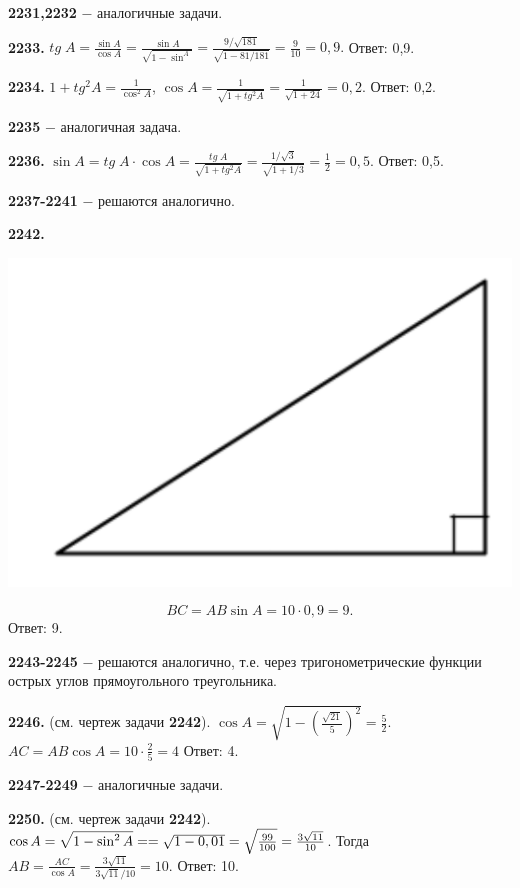  \textbf{2231,2232} $-$ аналогичные задачи.
 
 \textbf{2233.} $tg\;A=\frac{\sin{A}}{\cos{A}}=\frac{\sin{A}}{\sqrt{1-\sin^{A}}} = \frac{9/\sqrt{181}}{\sqrt{1 - 81/181}}=\frac{9}{10}=0,9.$ \newline \null \hspace*{\fill} Ответ: 0,9.
 
 \textbf{2234.} $1 + tg^2A=\frac{1}{\cos^2{A}}$, $\cos{A} = \frac{1}{\sqrt{1+tg^2A}}=\frac{1}{\sqrt{1+24}} = 0,2.$ \newline \null \hspace*{\fill} Ответ: 0,2.
 
 \textbf{2235} $-$ аналогичная задача.
 
 \textbf{2236.} $\sin{A} = tg\; A\cdot \cos{A} = \frac{tg\;A}{\sqrt{1+tg^2A}}=\frac{1/\sqrt{3}}{\sqrt{1+1/3}}=\frac{1}{2}=0,5$. \newline \null \hspace*{\fill} Ответ: 0,5.
 
 \textbf{2237-2241} $-$ решаются аналогично.
 
 \clearpage
 \textbf{2242.}
 
 {\centering \includegraphics[width=0.4\linewidth]{Geometry/Content/51.png}
 	
 }
\[
BC=AB\sin{A}=10\cdot0,9=9.
\]
\null \hspace*{\fill} Ответ: 9.

\textbf{2243-2245} $-$ решаются аналогично, т.е. через тригонометрические функции острых углов прямоугольного треугольника.

\textbf{2246.} (см. чертеж задачи \textbf{2242}). $\cos{A} = \sqrt{1-\left( \frac{\sqrt{21}}{5} \right)^2} = \frac{5}{2}.$ $AC=AB\cos{A}=10\cdot\frac{2}{5}=4$ \newline \null \hspace*{\fill} Ответ: 4.

\textbf{2247-2249} $-$ аналогичные задачи.

\textbf{2250.} (см. чертеж задачи \textbf{2242}). $\cos{A} = \sqrt{1-\sin^2{A}} = \linebreak= \sqrt{1-0,01}=\sqrt{\frac{99}{100}}=\frac{3\sqrt{11}}{10}$. Тогда $AB=\frac{AC}{\cos{A}}=\frac{3\sqrt{11}}{3\sqrt{11}/10}=10.$ \newline \null \hspace*{\fill} Ответ: 10.

